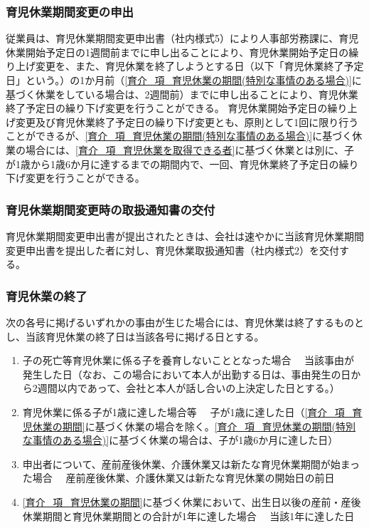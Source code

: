 \documentclass{jsarticle}
\begin{document}
\subsubsection{育児休業期間変更の申出}
\label{育介_項_育児休業期間変更の申出}
従業員は、育児休業期間変更申出書（社内様式5）により人事部労務課に、育児休業開始予定日の1週間前までに申し出ることにより、育児休業開始予定日の繰り上げ変更を、また、育児休業を終了しようとする日（以下「育児休業終了予定日」という。）の1か月前（\ref{育介_項_育児休業の期間(特別な事情のある場合)}に基づく休業をしている場合は、2週間前）までに申し出ることにより、育児休業終了予定日の繰り下げ変更を行うことができる。
育児休業開始予定日の繰り上げ変更及び育児休業終了予定日の繰り下げ変更とも、原則として1回に限り行うことができるが、\ref{育介_項_育児休業の期間(特別な事情のある場合)}に基づく休業の場合には、\ref{育介_項_育児休業を取得できる者}に基づく休業とは別に、子が1歳から1歳6か月に達するまでの期間内で、一回、育児休業終了予定日の繰り下げ変更を行うことができる。 

\subsubsection{育児休業期間変更時の取扱通知書の交付}
\label{育介_項_育児休業期間変更時の取扱通知書の交付}
育児休業期間変更申出書が提出されたときは、会社は速やかに当該育児休業期間変更申出書を提出した者に対し、育児休業取扱通知書（社内様式2）を交付する。

\subsubsection{育児休業の終了}
\label{育介_項_育児休業の終了}
次の各号に掲げるいずれかの事由が生じた場合には、育児休業は終了するものとし、当該育児休業の終了日は当該各号に掲げる日とする。 
\begin{enumerate}
  \item 子の死亡等育児休業に係る子を養育しないこととなった場合\label{enum:育介_項_育児休業の終了_子の死亡等}
        　当該事由が発生した日（なお、この場合において本人が出勤する日は、事由発生の日から2週間以内であって、会社と本人が話し合いの上決定した日とする。）
  \item 育児休業に係る子が1歳に達した場合等
        　子が1歳に達した日（\ref{育介_項_育児休業の期間}に基づく休業の場合を除く。\ref{育介_項_育児休業の期間(特別な事情のある場合)}に基づく休業の場合は、子が1歳6か月に達した日） 
  \item 申出者について、産前産後休業、介護休業又は新たな育児休業期間が始まった場合
        　産前産後休業、介護休業又は新たな育児休業の開始日の前日
  \item \ref{育介_項_育児休業の期間}に基づく休業において、出生日以後の産前・産後休業期間と育児休業期間との合計が1年に達した場合
        　当該1年に達した日
\end{enumerate}
\end{document}
